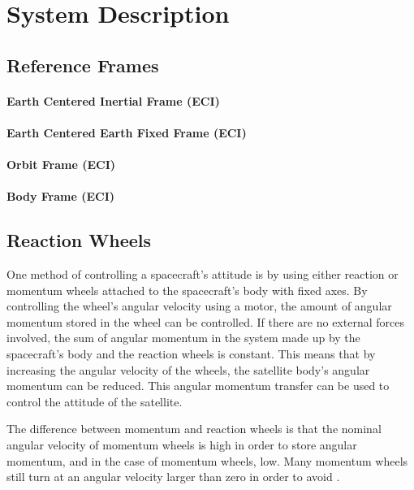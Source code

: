 \chapter{System Description}\label{chap:systemDescribtion}

\section{Reference Frames}

\subsubsection{Earth Centered Inertial Frame (ECI)}

\subsubsection{Earth Centered Earth Fixed Frame (ECI)}

\subsubsection{Orbit Frame (ECI)}

\subsubsection{Body Frame (ECI)}

\section{Reaction Wheels}

One method of controlling a spacecraft's attitude is by using either reaction or momentum wheels attached to the spacecraft's body with fixed axes. By controlling the wheel's angular velocity using a motor, the amount of angular momentum stored in the wheel can be controlled. If there are no external forces involved, the sum of angular momentum in the system made up by the spacecraft's body and the reaction wheels is constant. This means that by increasing the angular velocity of the wheels, the satellite body's angular momentum can be reduced. This angular momentum transfer can be used to control the attitude of the satellite.

The difference between momentum and reaction wheels is that the nominal angular velocity of momentum wheels is high in order to store angular momentum, and in the case of momentum wheels, low. Many momentum wheels still turn at an angular velocity larger than zero in order to avoid .

